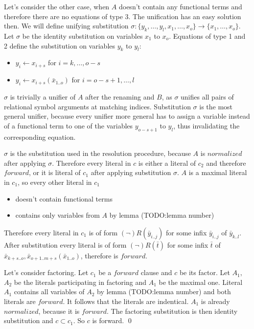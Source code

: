 \documentclass[english, shortabstract]{iithesis}
\theoremstyle{definition} \newtheorem{definition}{Definition}[chapter]
\theoremstyle{remark} \newtheorem{remark}[definition]{Observation}
\theoremstyle{plain} \newtheorem{theorem}[definition]{Theorem}
\theoremstyle{plain} \newtheorem{lemma}[definition]{Lemma}
\begin{document}
Let's consider the other case, when $A$ doesn't contain any functional terms and therefore there are no equations of type 3.
The unification has an easy solution then.%
We will define unifying substitution $\sigma : \{y_k,\dots,y_l, x_1, \dots, x_o\} \rightarrow \{x_1, \dots, x_o\}$.
Let $\sigma$ be the identity substitution on variables $x_1$ to $x_o$.
Equations of type 1 and 2 define the substitution on variables $y_k$ to $y_l$:
\begin{itemize}
    \item $y_i \leftarrow x_{i+s}$ for $i=k,\dots, o-s$
    \item $y_i \leftarrow x_{i+s}(\bar{x}_{1..o})$ for $i=o-s+1,\dots, l$
\end{itemize}
$\sigma$ is trivially a unifier of $A$ after the renaming and $B$, as
$\sigma$ unifies all pairs of relational symbol arguments at matching indices.
Substitution $\sigma$ is the most general unifier, because every unifier more general
has to assign a variable instead of a functional term to one of the variables $y_{o-s+1}$ to $y_l$, 
thus invalidating the corresponding equation. 

$\sigma$ is the substitution used in the resolution procedure, because $A$ is $normalized$ after applying $\sigma$.
Therefore every literal in $c$ is either a literal of $c_2$ and therefore $forward$, or it is 
literal of $c_1$ after applying substitution $\sigma$.
$A$ is a maximal literal in $c_1$, so every other literal in $c_1$ 
\begin{itemize}
    \item doesn't contain functional terms
    \item contains only variables from $A$ by lemma (TODO:lemma number)
\end{itemize}
Therefore every literal in $c_1$ is of form $(\lnot)R(\bar{y}_{i..j})$ for some infix $\bar{y}_{i..j}$ of $\bar{y}_{k..l}$.
After substitution every literal is of form $(\lnot)R(\bar{t})$ for some infix $\bar{t}$ of $\bar{x}_{k+s..o}, \bar{x}_{{o+1..m+s}}(\bar{x}_{1..o})$, therefore is $forward$.

\par Let's consider factoring. Let $c_1$ be a $forward$ clause and $c$ be its factor.
Let $A_1$, $A_2$ be the literals participating in factoring and $A_1$ be the maximal one.
Literal $A_1$ contains all variables of $A_2$ by lemma (TODO:lemma number) and both literals are $forward$. 
It follows that the literals are indentical. $A_1$ is already $normalized$, because it is $forward$.
The factoring substitution is then identity substitution and $c\subset c_1$. So $c$ is forward.
\qed
\end{document}
